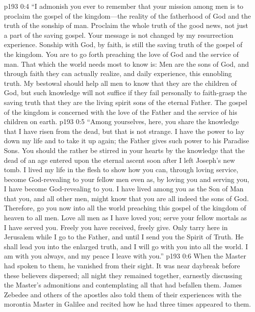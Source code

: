 \vs p193 0:4 \textcolor{ubdarkred}{“I admonish you ever to remember that your mission among men is to proclaim the gospel of the kingdom---the reality of the fatherhood of God and the truth of the sonship of man. Proclaim the whole truth of the good news, not just a part of the saving gospel. Your message is not changed by my resurrection experience. Sonship with God, by faith, is still the saving truth of the gospel of the kingdom. You are to go forth preaching the love of God and the service of man. That which the world needs most to know is: Men are the sons of God, and through faith they can actually realize, and daily experience, this ennobling truth. My bestowal should help all men to know that they are the children of God, but such knowledge will not suffice if they fail personally to faith\hyp{}grasp the saving truth that they are the living spirit sons of the eternal Father. The gospel of the kingdom is concerned with the love of the Father and the service of his children on earth.}
\vs p193 0:5 \textcolor{ubdarkred}{“Among yourselves, here, you share the knowledge that I have risen from the dead, but that is not strange. I have the power to lay down my life and to take it up again; the Father gives such power to his Paradise Sons. You should the rather be stirred in your hearts by the knowledge that the dead of an age entered upon the eternal ascent soon after I left Joseph’s new tomb. I lived my life in the flesh to show how you can, through loving service, become God\hyp{}revealing to your fellow men even as, by loving you and serving you, I have become God\hyp{}revealing to you. I have lived among you as the Son of Man that you, and all other men, might know that you are all indeed the sons of God. Therefore, go you now into all the world preaching this gospel of the kingdom of heaven to all men. Love all men as I have loved you; serve your fellow mortals as I have served you. Freely you have received, freely give. Only tarry here in Jerusalem while I go to the Father, and until I send you the Spirit of Truth. He shall lead you into the enlarged truth, and I will go with you into all the world. I am with you always, and my peace I leave with you.”}\plusone
\pc \vs p193 0:6 When the Master had spoken to them, he vanished from their sight. It was near daybreak before these believers dispersed; all night they remained together, earnestly discussing the Master’s admonitions and contemplating all that had befallen them. James Zebedee and others of the apostles also told them of their experiences with the morontia Master in Galilee and recited how he had three times appeared to them.
